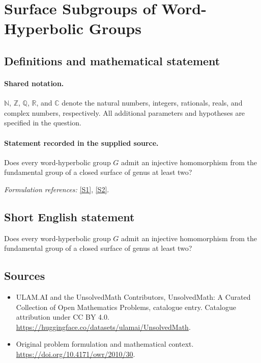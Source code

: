 \documentclass[11pt]{article}
\newcommand{\sref}[2]{\hyperlink{source:#1:#2}{[S#2]}}
\begin{document}
\section{Surface Subgroups of Word-Hyperbolic Groups}\label{statement}

\subsection{Definitions and mathematical statement}

\paragraph{Shared notation.}$\mathbb N$, $\mathbb Z$, $\mathbb Q$, $\mathbb R$, and $\mathbb C$ denote the natural numbers, integers, rationals, reals, and complex numbers, respectively. All additional parameters and hypotheses are specified in the question.


\paragraph{Statement recorded in the supplied source.}
Does every word-hyperbolic group $G$ admit an injective homomorphism from the fundamental group of a closed surface of genus at least two?
\par\smallskip\textit{Formulation references:} \sref{statement}{1}, \sref{statement}{2}.
\subsection{Short English statement}
Does every word-hyperbolic group $G$ admit an injective homomorphism from the fundamental group of a closed surface of genus at least two?
\subsection{Sources}
\begin{itemize}
\item[\hypertarget{source:statement:1}{S1}] ULAM.AI and the UnsolvedMath Contributors, UnsolvedMath: A Curated Collection of Open Mathematics Problems, catalogue entry. Catalogue attribution under CC BY 4.0.
\url{https://huggingface.co/datasets/ulamai/UnsolvedMath}.
\item[\hypertarget{source:statement:2}{S2}] Original problem formulation and mathematical context.
\url{https://doi.org/10.4171/owr/2010/30}.
\end{itemize}
\label{end:statement}
\end{document}
